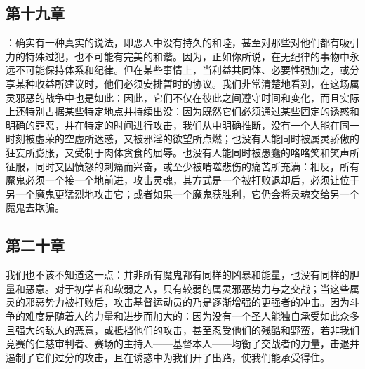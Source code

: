 
\subsection{第十九章}

\par

：确实有一种真实的说法，即恶人中没有持久的和睦，甚至对那些对他们都有吸引力的特殊过犯，也不可能有完美的和谐。因为，正如你所说，在无纪律的事物中永远不可能保持体系和纪律。但在某些事情上，当利益共同体、必要性强加之，或分享某种收益所建议时，他们必须安排暂时的协议。我们非常清楚地看到，在这场属灵邪恶的战争中也是如此：因此，它们不仅在彼此之间遵守时间和变化，而且实际上还特别占据某些特定地点并持续出没：因为既然它们必须通过某些固定的诱惑和明确的罪恶，并在特定的时间进行攻击，我们从中明确推断，没有一个人能在同一时刻被虚荣的空虚所迷惑，又被邪淫的欲望所点燃；也没有人能同时被属灵骄傲的狂妄所膨胀，又受制于肉体贪食的屈辱。也没有人能同时被愚蠢的咯咯笑和笑声所征服，同时又因愤怒的刺痛而兴奋，或至少被啃噬悲伤的痛苦所充满：相反，所有魔鬼必须一个接一个地前进，攻击灵魂，其方式是一个被打败退却后，必须让位于另一个魔鬼更猛烈地攻击它；或者如果一个魔鬼获胜利，它仍会将灵魂交给另一个魔鬼去欺骗。\par


\subsection{第二十章}

\par

我们也不该不知道这一点：并非所有魔鬼都有同样的凶暴和能量，也没有同样的胆量和恶意。对于初学者和软弱之人，只有较弱的属灵邪恶势力与之交战；当这些属灵的邪恶势力被打败后，攻击基督运动员的乃是逐渐增强的更强者的冲击。因为斗争的难度是随着人的力量和进步而加大的：因为没有一个圣人能独自承受如此众多且强大的敌人的恶意，或抵挡他们的攻击，甚至忍受他们的残酷和野蛮，若非我们竞赛的仁慈审判者、赛场的主持人——基督本人——均衡了交战者的力量，击退并遏制了它们过分的攻击，且在诱惑中为我们开了出路，使我们能承受得住。\par


